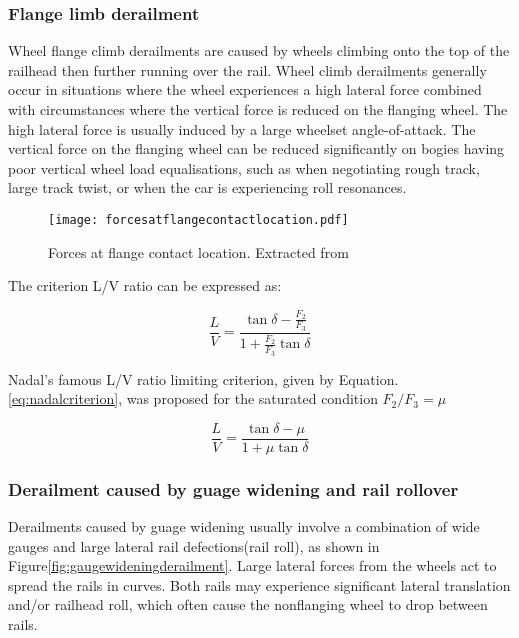 \subsubsection{Flange limb derailment}
Wheel flange climb derailments are caused by wheels climbing onto the top of the railhead then further running over the rail. Wheel climb derailments generally occur in situations where the wheel experiences a high lateral force combined with circumstances where the vertical force is reduced on the flanging wheel. The high lateral force is usually induced by a large wheelset angle-of-attack. The vertical force on the flanging wheel can be reduced significantly on bogies having poor vertical wheel load equalisations, such as when negotiating rough track, large track twist, or when the car is experiencing roll resonances. 

\begin{figure}[h]
	\centering
	\texttt{[image: forcesatflangecontactlocation.pdf]}
	\caption{Forces at flange contact location. Extracted from \cite[Figure8.4]{iwnicki2006handbook}}
	\label{fig:forcesatflangecontactlocation}
\end{figure}

The criterion L/V ratio can be expressed as:

\begin{equation}
	\frac{L}{V}=\frac{\tan \delta -\frac{F_2}{F_3}}{1+\frac{F_2}{F_3}\tan \delta}
\end{equation}

Nadal's famous L/V ratio limiting criterion, given by Equation.\ref{eq:nadalcriterion}, was proposed for the saturated condition $F_2/F_3=\mu$

\begin{equation}\label{eq:nadalcriterion}
	\frac{L}{V}=\frac{\tan \delta - \mu}{1+ \mu \tan \delta}
\end{equation}

\subsubsection{Derailment caused by guage widening and rail rollover}
Derailments caused by guage widening usually involve a combination of wide gauges and large lateral rail defections(rail roll), as shown in Figure\ref{fig:gaugewideningderailment}. Large lateral forces from the wheels act to spread the rails in curves. Both rails may experience significant lateral translation and/or railhead roll, which often cause the nonflanging wheel to drop between rails.

